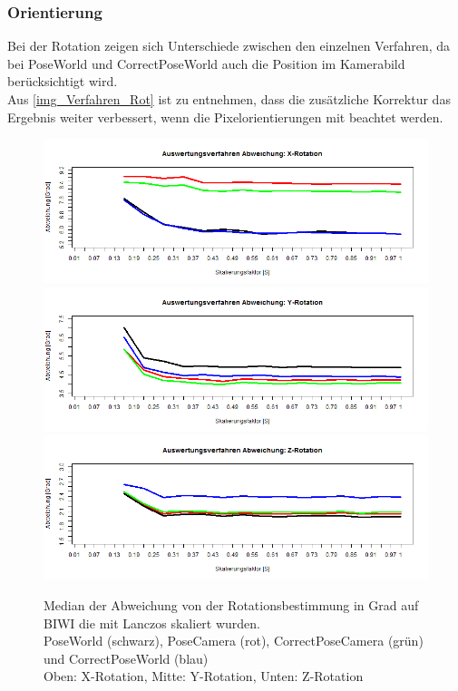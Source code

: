 \subsubsection{Orientierung}
Bei der Rotation zeigen sich Unterschiede zwischen den einzelnen Verfahren, da bei PoseWorld und CorrectPoseWorld auch die Position im Kamerabild berücksichtigt wird.\\
Aus \autoref{img_Verfahren_Rot} ist zu entnehmen, dass die zusätzliche Korrektur das Ergebnis weiter verbessert, wenn die Pixelorientierungen mit beachtet werden.
\begin{figure}
	\centering
	\includegraphics[width=\linewidth]{img_Skalierung/Verfahren_RX}
	\includegraphics[width=\linewidth]{img_Skalierung/Verfahren_RY}
	\includegraphics[width=\linewidth]{img_Skalierung/Verfahren_RZ}
	\caption{Median der Abweichung von der Rotationsbestimmung in Grad auf BIWI \cite{database_Face_Ori} die mit Lanczos skaliert wurden.\\
		PoseWorld (schwarz), PoseCamera (rot), CorrectPoseCamera (grün) und CorrectPoseWorld (blau)\\
		Oben: X-Rotation, Mitte: Y-Rotation, Unten: Z-Rotation}
	\label{img_Verfahren_Rot}
\end{figure}
